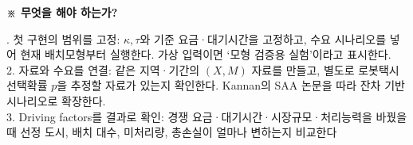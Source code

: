 \documentclass[11pt,a4paper]{article}
\newcommand{\blocktitle}[1]{\par\bigskip\noindent\textbf{\large #1}\par\smallskip}
\begin{document}
\blocktitle{※ 무엇을 해야 하는가?}
1. 첫 구현의 범위를 고정: \(\kappa,\tau\)와 기준 요금·대기시간을 고정하고, 수요 시나리오를 넣어 현재 배치모형부터 실행한다. 가상 입력이면 ‘모형 검증용 실험’이라고 표시한다.\\
2. 자료와 수요를 연결: 같은 지역·기간의 \((X,M)\) 자료를 만들고, 별도로 로봇택시 선택확률 \(p\)을 추정할 자료가 있는지 확인한다. Kannan의 SAA 논문을 따라 잔차 기반 시나리오로 확장한다. \\
3. Driving factors를 결과로 확인: 경쟁 요금·대기시간·시장규모·처리능력을 바꿨을 때 선정 도시, 배치 대수, 미처리량, 총손실이 얼마나 변하는지 비교한다
\end{document}
